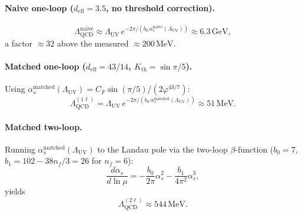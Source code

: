\documentclass[11pt,a4paper]{article}
\theoremstyle{definition}
\theoremstyle{remark}
\newcommand{\vp}{\varphi}
\newcommand{\LUV}{\Lambda_{\mathrm{UV}}}
\newcommand{\LQCD}{\Lambda_{\mathrm{QCD}}}
\newcommand{\deff}{d_{\mathrm{eff}}}
\begin{document}
\paragraph{Naive one-loop ($\deff=3.5$, no threshold correction).}
\begin{equation}
  \LQCD^{\mathrm{naive}}
  \approx \LUV\,e^{-2\pi/(b_0\,\alpha_s^{\mathrm{naive}}(\LUV))}
  \approx 6.3\,\mathrm{GeV},
  \label{P5:eq:LQCD_val}
\end{equation}
a factor $\approx32$ above the measured $\approx200\,\mathrm{MeV}$.

\paragraph{Matched one-loop ($\deff=43/14$, $K_{\mathrm{th}}=\sin\pi/5$).}
Using $\alpha_s^{\mathrm{matched}}(\LUV)=C_F\sin(\pi/5)/(2\vp^{43/7})$:
\begin{equation}
  \LQCD^{(1\ell)} = \LUV\,e^{-2\pi/(b_0\,\alpha_s^{\mathrm{matched}}(\LUV))}
  \approx 51\,\mathrm{MeV}.
  \label{P5:eq:LQCD_1loop}
\end{equation}

\paragraph{Matched two-loop.}
Running $\alpha_s^{\mathrm{matched}}(\LUV)$ to the Landau pole via the
two-loop $\beta$-function
($b_0=7$, $b_1 = 102-38n_f/3 = 26$ for $n_f=6$):
\begin{equation}
  \frac{d\alpha_s}{d\ln\mu}
  = -\frac{b_0}{2\pi}\alpha_s^2 - \frac{b_1}{4\pi^2}\alpha_s^3,
  \label{P5:eq:beta_2loop}
\end{equation}
yields
\begin{equation}
  \LQCD^{(2\ell)} \approx 544\,\mathrm{MeV}.
  \label{P5:eq:LQCD_2loop}
\end{equation}
\end{document}
